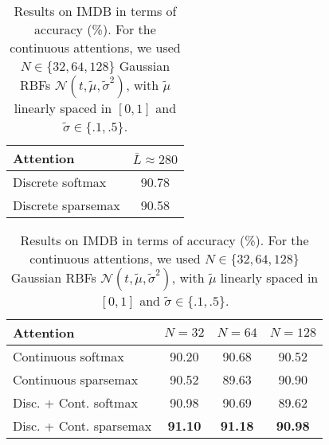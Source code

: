 \documentclass{article}
\begin{document}
\begin{table}[t]
    \caption{Results on IMDB in terms of accuracy (\%). 
    For the continuous attentions, we used $N \in \{32, 64, 128\}$ Gaussian RBFs 
$\mathcal{N}(t, \tilde{\mu}, \tilde{\sigma}^2)$, with $\tilde{\mu}$ linearly spaced in $[0,1]$ and $\tilde{\sigma} \in \{.1, .5\}$. 
} 
    \label{table:results_doc_classification}
    \vspace{-0.1cm}
    \begin{scriptsize}
    \begin{center}
\begin{comment}
\begin{tabular}{lclccclccc}
        \toprule
        \sc Discrete & $\bar{L} \approx 280$ & \sc Continuous & $N=32$ & $N=64$ & $N=128$ & \sc Disc. + Cont. & $N=32$ & $N=64$ & $N=128$\\
        \midrule 
        softmax    		& 90.78		& 
        softmax			& 90.20		& 90.68		& 90.52    &
        softmax		& 90.98		& 90.69		& 89.62   	\\
        sparsemax	 		& 90.58		& 
        sparsemax	 	& 90.52		& 89.63		& 90.90   	&
        sparsemax	 	& \bf 91.10		& \bf 91.18		& \bf 90.98    	\\
        \bottomrule
    \end{tabular}
\end{comment}
\begin{tabular}{lc}
        \toprule
        \sc Attention & $\bar{L} \approx 280$ \\
        \midrule 
        Discrete softmax    		& 90.78 	\\
        Discrete sparsemax	 		& 90.58 	\\
       \bottomrule
 \end{tabular}
 \qquad
\begin{tabular}{lccc}
        \toprule
        \sc Attention & $N=32$ & $N=64$ & $N=128$ \\
       \midrule
        Continuous softmax			& 90.20		& 90.68		& 90.52    	\\
        Continuous sparsemax	 	& 90.52		& 89.63		& 90.90   	\\
        Disc. + Cont. softmax		& 90.98		& 90.69		& 89.62   	\\
        Disc. + Cont. sparsemax	 	& \bf 91.10		& \bf 91.18		& \bf 90.98    	\\
        \bottomrule
    \end{tabular}
\begin{comment}
\begin{tabular}{lccc}

\end{comment}
\end{center}
\end{scriptsize}
\end{table}
\end{document}
